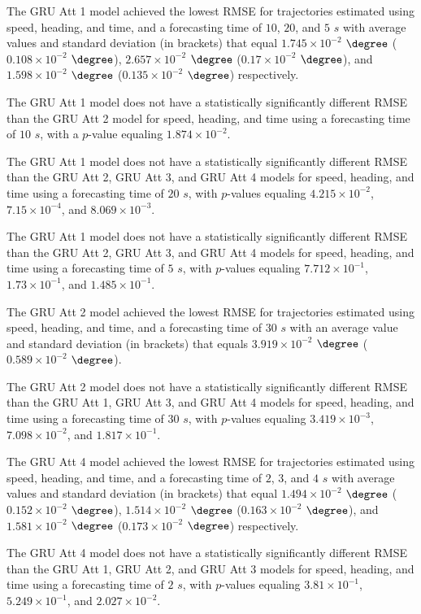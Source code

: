 The GRU Att 1 model achieved the lowest RMSE for trajectories estimated using speed, heading, and time, and a forecasting time of $10$, $20$, and $5$ $s$ with average values and standard deviation (in brackets) that equal $1.745 \times 10^{-2}$ $\degree$ ($0.108 \times 10^{-2}$ $\degree$), $2.657 \times 10^{-2}$ $\degree$ ($0.17 \times 10^{-2}$ $\degree$), and $1.598 \times 10^{-2}$ $\degree$ ($0.135 \times 10^{-2}$ $\degree$) respectively.

The GRU Att 1 model does not have a statistically significantly different RMSE than the GRU Att 2 model for speed, heading, and time using a forecasting time of $10$ $s$, with a $p$-value equaling $1.874 \times 10^{-2}$.

The GRU Att 1 model does not have a statistically significantly different RMSE than the GRU Att 2, GRU Att 3, and GRU Att 4 models for speed, heading, and time using a forecasting time of $20$ $s$, with $p$-values equaling $4.215 \times 10^{-2}$, $7.15 \times 10^{-4}$, and $8.069 \times 10^{-3}$.

The GRU Att 1 model does not have a statistically significantly different RMSE than the GRU Att 2, GRU Att 3, and GRU Att 4 models for speed, heading, and time using a forecasting time of $5$ $s$, with $p$-values equaling $7.712 \times 10^{-1}$, $1.73 \times 10^{-1}$, and $1.485 \times 10^{-1}$.

The GRU Att 2 model achieved the lowest RMSE for trajectories estimated using speed, heading, and time, and a forecasting time of $30$ $s$ with an average value and standard deviation (in brackets) that equals $3.919 \times 10^{-2}$ $\degree$ ($0.589 \times 10^{-2}$ $\degree$).

The GRU Att 2 model does not have a statistically significantly different RMSE than the GRU Att 1, GRU Att 3, and GRU Att 4 models for speed, heading, and time using a forecasting time of $30$ $s$, with $p$-values equaling $3.419 \times 10^{-3}$, $7.098 \times 10^{-2}$, and $1.817 \times 10^{-1}$.

The GRU Att 4 model achieved the lowest RMSE for trajectories estimated using speed, heading, and time, and a forecasting time of $2$, $3$, and $4$ $s$ with average values and standard deviation (in brackets) that equal $1.494 \times 10^{-2}$ $\degree$ ($0.152 \times 10^{-2}$ $\degree$), $1.514 \times 10^{-2}$ $\degree$ ($0.163 \times 10^{-2}$ $\degree$), and $1.581 \times 10^{-2}$ $\degree$ ($0.173 \times 10^{-2}$ $\degree$) respectively.

The GRU Att 4 model does not have a statistically significantly different RMSE than the GRU Att 1, GRU Att 2, and GRU Att 3 models for speed, heading, and time using a forecasting time of $2$ $s$, with $p$-values equaling $3.81 \times 10^{-1}$, $5.249 \times 10^{-1}$, and $2.027 \times 10^{-2}$.

